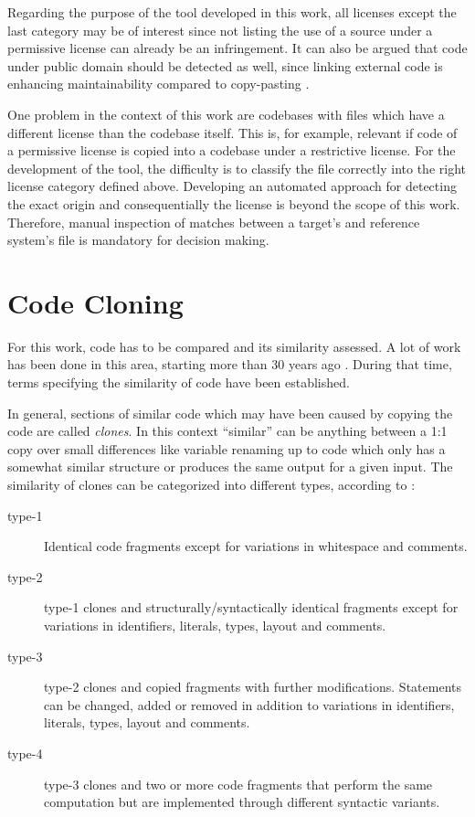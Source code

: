 Regarding the purpose of the tool developed in this work, all licenses except the last category may be of interest since not listing the use of a source under a permissive license can already be an infringement.
It can also be argued that code under public domain should be detected as well, since linking external code is enhancing maintainability compared to copy-pasting \cite{heinemann2012effective}.

One problem in the context of this work are codebases with files which have a different license than the codebase itself.
This is, for example, relevant if code of a permissive license is copied into a codebase under a restrictive license.
For the development of the tool, the difficulty is to classify the file correctly into the right license category defined above.
Developing an automated approach for detecting the exact origin and consequentially the license is beyond the scope of this work.
Therefore, manual inspection of matches between a target's and reference system's file is mandatory for decision making.

\section{Code Cloning}\label{section:preliminaries/code_cloning}
For this work, code has to be compared and its similarity assessed.
A lot of work has been done in this area, starting more than 30 years ago \cite{lancaster2004comparison}.
During that time, terms specifying the similarity of code have been established.

In general, sections of similar code which may have been caused by copying the code are called \textit{clones}.
In this context ``similar'' can be anything between a 1:1 copy over small differences like variable renaming up to code which only has a somewhat similar structure or produces the same output for a given input.
The similarity of clones can be categorized into different types, according to \cite{roy2007survey}:

\begin{description}
	\item[type-1] Identical code fragments except for variations in whitespace and comments.
	\item[type-2] type-1 clones and structurally/syntactically identical fragments except for variations in identifiers, literals, types, layout and comments.
	\item[type-3] type-2 clones and copied fragments with further modifications. Statements can be changed, added or removed in addition to variations in identifiers, literals, types, layout and comments.
	\item[type-4] type-3 clones and two or more code fragments that perform the same computation but are implemented through different syntactic variants.
\end{description}

